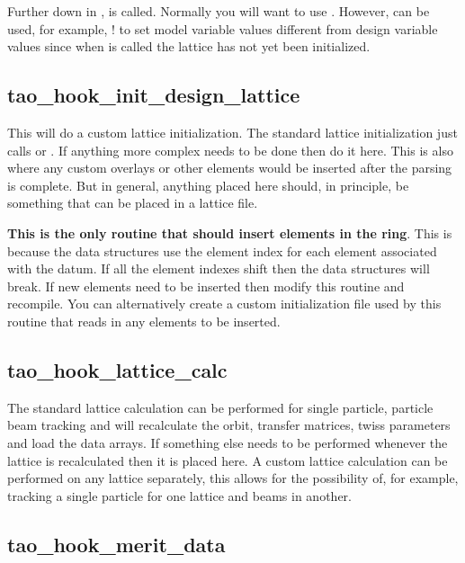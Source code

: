 {Further down in ,  is called. Normally you will want to
use . However,  can be used, for example, ! to set
model variable values different from design variable values since when 
is called the  lattice has not yet been initialized.

\subsection{tao_hook_init_design_lattice}

This will do a custom lattice initialization. The standard lattice
initialization just calls  or . If
anything more complex needs to be done then do it here. This is also
where any custom overlays or other elements would be inserted after
the parsing is complete. But in general, anything placed here should,
in principle, be something that can be placed in a lattice file.

\textbf{This is the only routine that should insert elements in the
ring}. This is because the \tao data structures use the element index
for each element associated with the datum. If all the element indexes
shift then the data structures will break. If new elements need to be
inserted then modify this routine and recompile. You can alternatively
create a custom initialization file used by this routine that reads in
any elements to be inserted.

\subsection{tao_hook_lattice_calc}

The standard lattice calculation can be performed for single particle,
particle beam tracking and will recalculate the
orbit, transfer matrices, twiss parameters and load the data
arrays. If something else needs to be performed whenever the lattice
is recalculated then it is placed here. A custom lattice calculation
can be performed on any lattice separately, this allows for the
possibility of, for example, tracking a single particle for one
lattice and beams in another.

\subsection{tao_hook_merit_data}

}
